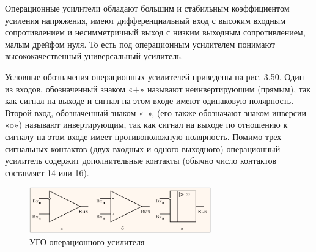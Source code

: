 \documentclass[unicode, 12pt, a4paper, oneside]{article}
\begin{document}
Операционные усилители обладают большим и стабильным коэффициентом усиления напряжения, имеют дифференциальный вход с высоким входным сопротивлением и несимметричный выход с низким выходным сопротивлением, малым дрейфом нуля. То есть под операционным усилителем понимают высококачественный универсальный усилитель.

Условные обозначения операционных усилителей приведены на рис. 3.50. Один из входов, обозначенный знаком «+» называют неинвертирующим (прямым), так как сигнал на выходе и сигнал на этом входе имеют одинаковую полярность. Второй вход, обозначенный знаком «–», (его также обозначают знаком инверсии «o») называют инвертирующим, так как сигнал на выходе по отношению к сигналу на этом входе имеет противоположную полярность. Помимо трех сигнальных контактов (двух входных и одного выходного) операционный усилитель содержит дополнительные контакты (обычно число контактов составляет 14 или 16).
\begin{figure}[H]
\centering
\includegraphics[width=0.7\textwidth]{8_oa_graphic.png}
\caption{УГО операционного усилителя}
\label{fig:8_oa_graphic}
\end{figure}
\end{document}
